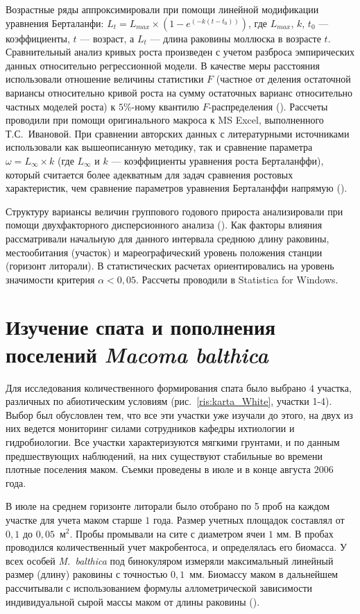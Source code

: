 Возрастные ряды аппроксимировали при помощи линейной модификации уравнения Берталанфи: $L_{t} = L_{max} \times (1 - e^{(-k(t - t_{0}))})$, где $L_{max}$, $k$, $t_{0}$ --- коэффициенты, $t$ --- возраст, а $L_{t}$ --- длина раковины моллюска в возрасте $t$.
Сравнительный анализ кривых роста произведен с учетом разброса эмпирических данных относительно регрессионной модели. 
В качестве меры расстояния использовали отношение величины статистики $F$ (частное от деления остаточной вариансы относительно кривой роста на сумму остаточных варианс относительно частных моделей роста) к $5$\%-ному квантилю $F$-распределения (\cite{Maximovich_1989}). 
Рассчеты проводили при помощи оригинального макроса к MS Excel, выполненного Т.С.~Ивановой.
При сравнении авторских данных с литературными источниками использовали как вышеописанную методику, так и сравнение параметра $\omega = L_{\infty} \times k$ (где $L_{\infty}$ и $k$ --- коэффициенты уравнения роста Берталанффи), который считается более адекватным для задач сравнения ростовых характеристик, чем сравнение параметров уравнения Берталанффи напрямую (\cite{Appeldoorn_1983, Beukema_Meehan_1985}). 

Структуру вариансы величин группового годового прироста анализировали при помощи двухфакторного дисперсионного анализа (\cite{Chambers_Hastie_1991}). 
Как факторы влияния рассматривали начальную для данного интервала среднюю длину раковины, местообитания (участок) и мареографический уровень положения станции (горизонт литорали).
В статистических расчетах ориентировались на уровень значимости критерия $\alpha < 0,05$.
Рассчеты проводили в Statistica for Windows.

\afterpage{\clearpage}

	\section{Изучение спата и пополнения поселений {\it Macoma balthica}}
Для исследования количественного формирования спата было выбрано $4$ участка, различных по абиотическим условиям (рис.~\ref{ris:karta_White}, участки 1-4). 
Выбор был обусловлен тем, что все эти участки уже изучали до этого, на двух из них ведется мониторинг силами сотрудников кафедры ихтиологии и гидробиологии. 
Все участки характеризуются мягкими грунтами, и по данным предшествующих наблюдений, на них существуют стабильные во времени плотные поселения маком.
Съемки проведены в июле и в конце августа $2006$ года.

В июле на среднем горизонте литорали было отобрано по 5 проб на каждом участке для учета маком старше $1$ года. 
Размер учетных площадок составлял от $0,1$ до $0,05$~м$^2$. 
Пробы промывали на сите с диаметром ячеи $1$ мм. 
В пробах проводился количественный учет макробентоса, и определялась его биомасса.
У всех особей \textit{M.~balthica} под бинокуляром измеряли максимальный линейный размер (длину) раковины с точностью $0,1$~мм. 
Биомассу маком в дальнейшем рассчитывали с использованием формулы аллометрической зависимости индивидуальной сырой массы маком от длины раковины (\cite{Maximovich_et_al_1993}).

